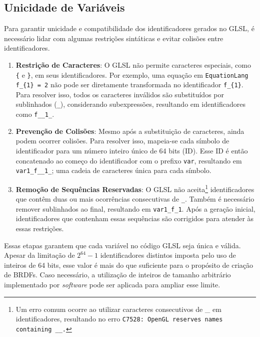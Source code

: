 \subsection{Unicidade de Variáveis} \label{sec-unicidade}

Para garantir unicidade e compatibilidade dos identificadores gerados no GLSL, é necessário lidar com algumas restrições sintáticas e evitar colisões entre identificadores.

\begin{enumerate}
    \item \textbf{Restrição de Caracteres}: O GLSL não permite caracteres especiais, como \verb"{" e \verb"}", em seus identificadores. Por exemplo, uma equação em \texttt{EquationLang} \verb "f_{1} = 2" não pode ser diretamente transformada no identificador \verb`f_{1}`. Para resolver isso, todos os caracteres inválidos são substituídos por sublinhados (\verb`_`), considerando subexpressões, resultando em identificadores como \verb`f__1_`.

    \item \textbf{Prevenção de Colisões}: Mesmo após a substituição de caracteres, ainda podem ocorrer colisões. Para resolver isso, mapeia-se cada símbolo de identificador para um número inteiro único de 64 bits (ID). Esse ID é então concatenado ao começo do identificador com o prefixo \verb"var", resultando em \verb"var1_f__1_"; uma cadeia de caracteres única para cada símbolo.

    \item \textbf{Remoção de Sequências Reservadas}: O GLSL não aceita\footnote{Um erro comum ocorre ao utilizar caracteres consecutivos de \_ em identificadores, resultando no erro \texttt{C7528: OpenGL reserves names containing \_\_.}} identificadores que contêm duas ou mais ocorrências consecutivas de \verb`_`.
     Também é necessário remover sublinhados ao final, resultando em \verb`var1_f_1`. Após a geração inicial, identificadores que contenham essas sequências são corrigidos para atender às essas restrições.
\end{enumerate}


Essas etapas garantem que cada variável no código GLSL seja única e válida. Apesar da limitação de $2^{64} - 1$ identificadores distintos imposta pelo uso de inteiros de 64 bits, esse valor é mais do que suficiente para o propósito de criação de BRDFs. Caso necessário, a utilização de inteiros de tamanho arbitrário implementado por \textit{software} pode ser aplicada para ampliar esse limite.


